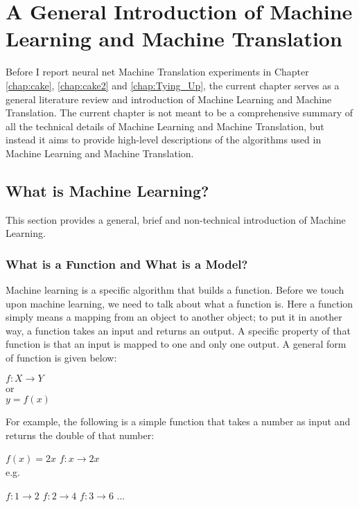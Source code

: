 \chapter{A General Introduction of Machine Learning and Machine Translation}
\label{chap:MT}


Before I report neural net Machine Translation experiments in Chapter \ref{chap:cake}, \ref{chap:cake2} and \ref{chap:Tying_Up}, the current chapter serves as a general literature review and introduction of Machine Learning and Machine Translation. The current chapter is not meant to be a comprehensive summary of all the technical details of Machine Learning and Machine Translation, but instead it aims to provide high-level descriptions of the algorithms used in Machine Learning and Machine Translation. 

\section{What is Machine Learning?}

This section provides a general, brief and non-technical introduction of Machine Learning.

\subsection{What is a Function and What is a Model?}
Machine learning is a specific algorithm that builds a function. Before we touch upon machine learning, we need to talk about what a function is. Here a function simply means a mapping from an object to another object; to put it in another way, a function takes an input and returns an output. A specific property of that function is that an input is mapped to one and only one output. A general form of function is given below:

\begin{exe}
\ex $f: X \rightarrow Y$\\
	or \\
	$ y=f(x) $
\end{exe} 


For example, the following is a simple function that takes a number as input and returns the double of that number:

\begin{exe}
\ex \label{math_function}
\begin{xlist}
\ex $f(x)=2x$
\ex $f: x \rightarrow 2x $\\
	e.g.
	\begin{xlist}
	\ex $f: 1 \rightarrow 2$
	\ex $f: 2 \rightarrow 4$
	\ex $f: 3 \rightarrow 6$
	\ex $\dots$
	\end{xlist}
\end{xlist}
\end{exe}

